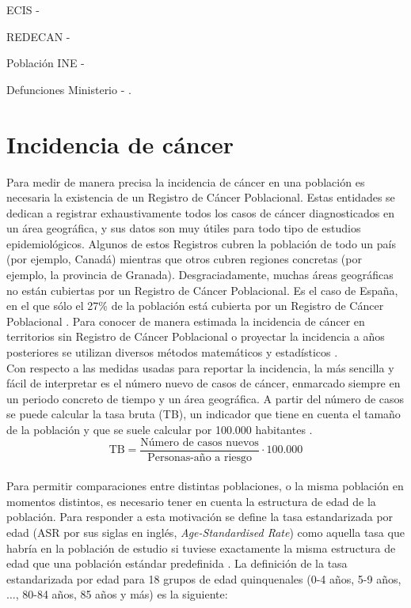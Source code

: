 ECIS - \cite{ECIS, ECIS2}

REDECAN - \cite{REDECAN2020}

Población INE - \cite{INEpob}

Defunciones Ministerio - \cite{MSCBS}.

\section{Incidencia de cáncer}

Para medir de manera precisa la incidencia de cáncer en una población es necesaria la existencia de un Registro de Cáncer Poblacional. Estas entidades se dedican a registrar exhaustivamente todos los casos de cáncer diagnosticados en un área geográfica, y sus datos son muy útiles para todo tipo de estudios epidemiológicos. Algunos de estos Registros cubren la población de todo un país (por ejemplo, Canadá) mientras que otros cubren regiones concretas (por ejemplo, la provincia de Granada). Desgraciadamente, muchas áreas geográficas no están cubiertas por un Registro de Cáncer Poblacional. Es el caso de España, en el que sólo el 27\% de la población está cubierta por un Registro de Cáncer Poblacional \cite{Redondo-Sanchez2019}. Para conocer de manera estimada la incidencia de cáncer en territorios sin Registro de Cáncer Poblacional o proyectar la incidencia a años posteriores se utilizan diversos métodos matemáticos y estadísticos \cite{Bray2018, GCO, ECIS, ECIS2, REDECAN2020, Redondo-Sanchez2019}.\\

Con respecto a las medidas usadas para reportar la incidencia, la más sencilla y fácil de interpretar es el número nuevo de casos de cáncer, enmarcado siempre en un periodo concreto de tiempo y un área geográfica. A partir del número de casos se puede calcular la tasa bruta (TB), un indicador que tiene en cuenta el tamaño de la población y que se suele calcular por 100.000 habitantes \cite{IARC1995}.\\

$$\text{TB}  = \dfrac{\text{Número de casos nuevos}}{\text{Personas-año a riesgo}} \cdot 100.000 $$\\

Para permitir comparaciones entre distintas poblaciones, o la misma población en momentos distintos, es necesario tener en cuenta la estructura de edad de la población. Para responder a esta motivación se define la tasa estandarizada por edad (ASR por sus siglas en inglés, \textit{Age-Standardised Rate}) como aquella tasa que habría en la población de estudio si tuviese exactamente la misma estructura de edad que una población estándar predefinida \cite{IARC1995}. La definición de la tasa estandarizada por edad para 18 grupos de edad quinquenales (0-4 años, 5-9 años, $\dots$, 80-84 años, 85 años y más) es la siguiente:

